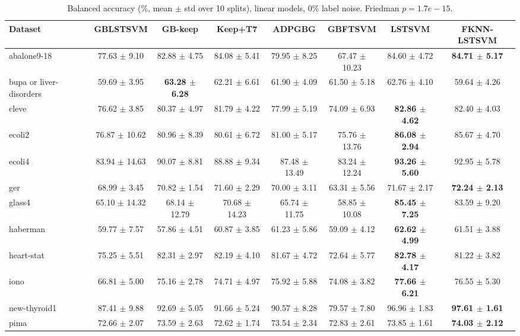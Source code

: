\begin{table}[t]
\centering\small
\caption{Balanced accuracy (\%, mean $\pm$ std over 10 splits), linear models, 0\% label noise. Friedman $p = 1.7e-15$.}
\begin{tabular}{lccccccc}
\toprule
Dataset & GBLSTSVM & GB-keep & Keep+T7 & ADPGBG & GBFTSVM & LSTSVM & FKNN-LSTSVM \\
\midrule
abalone9-18 & 77.63 $\pm$ 9.10 & 82.88 $\pm$ 4.75 & 84.08 $\pm$ 5.41 & 79.95 $\pm$ 8.25 & 67.47 $\pm$ 10.23 & 84.60 $\pm$ 4.72 & \textbf{84.71 $\pm$ 5.17} \\
bupa or liver-disorders & 59.69 $\pm$ 3.95 & \textbf{63.28 $\pm$ 6.28} & 62.21 $\pm$ 6.61 & 61.90 $\pm$ 4.09 & 61.50 $\pm$ 5.18 & 62.76 $\pm$ 4.10 & 59.64 $\pm$ 4.26 \\
cleve & 76.62 $\pm$ 3.85 & 80.37 $\pm$ 4.97 & 81.79 $\pm$ 4.22 & 77.99 $\pm$ 5.19 & 74.09 $\pm$ 6.93 & \textbf{82.86 $\pm$ 4.62} & 82.40 $\pm$ 4.03 \\
ecoli2 & 76.87 $\pm$ 10.62 & 80.96 $\pm$ 8.39 & 80.61 $\pm$ 6.72 & 81.00 $\pm$ 5.17 & 75.76 $\pm$ 13.76 & \textbf{86.08 $\pm$ 2.94} & 85.67 $\pm$ 4.70 \\
ecoli4 & 83.94 $\pm$ 14.63 & 90.07 $\pm$ 8.81 & 88.88 $\pm$ 9.34 & 87.48 $\pm$ 13.49 & 83.24 $\pm$ 12.24 & \textbf{93.26 $\pm$ 5.60} & 92.95 $\pm$ 5.78 \\
ger & 68.99 $\pm$ 3.45 & 70.82 $\pm$ 1.54 & 71.60 $\pm$ 2.29 & 70.00 $\pm$ 3.11 & 63.31 $\pm$ 5.56 & 71.67 $\pm$ 2.17 & \textbf{72.24 $\pm$ 2.13} \\
glass4 & 65.10 $\pm$ 14.32 & 68.14 $\pm$ 12.79 & 70.68 $\pm$ 14.23 & 65.74 $\pm$ 11.75 & 58.85 $\pm$ 10.08 & \textbf{85.45 $\pm$ 7.25} & 83.59 $\pm$ 9.20 \\
haberman & 59.77 $\pm$ 7.57 & 57.86 $\pm$ 4.51 & 60.87 $\pm$ 3.85 & 61.23 $\pm$ 5.86 & 59.09 $\pm$ 4.12 & \textbf{62.62 $\pm$ 4.99} & 61.51 $\pm$ 3.88 \\
heart-stat & 75.25 $\pm$ 5.51 & 82.31 $\pm$ 2.97 & 82.19 $\pm$ 4.10 & 81.67 $\pm$ 4.72 & 72.64 $\pm$ 5.77 & \textbf{82.78 $\pm$ 4.17} & 81.22 $\pm$ 3.82 \\
iono & 66.81 $\pm$ 5.00 & 75.16 $\pm$ 2.78 & 74.71 $\pm$ 4.97 & 75.92 $\pm$ 5.88 & 74.08 $\pm$ 3.82 & \textbf{77.66 $\pm$ 6.21} & 76.55 $\pm$ 5.30 \\
new-thyroid1 & 87.41 $\pm$ 9.88 & 92.69 $\pm$ 5.05 & 91.66 $\pm$ 5.24 & 90.57 $\pm$ 8.28 & 79.57 $\pm$ 7.80 & 96.96 $\pm$ 1.83 & \textbf{97.61 $\pm$ 1.61} \\
pima & 72.66 $\pm$ 2.07 & 73.59 $\pm$ 2.63 & 72.62 $\pm$ 1.74 & 73.54 $\pm$ 2.34 & 72.83 $\pm$ 2.61 & 73.85 $\pm$ 1.61 & \textbf{74.03 $\pm$ 2.12} \\

\end{tabular}
\end{table}
